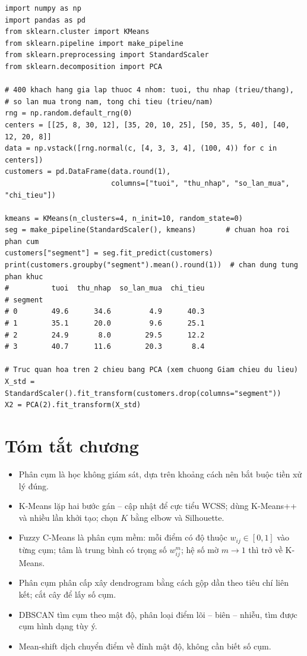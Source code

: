 \begin{lstlisting}[caption={Phân khúc khách hàng: tiền xử lý rồi phân cụm}]
import numpy as np
import pandas as pd
from sklearn.cluster import KMeans
from sklearn.pipeline import make_pipeline
from sklearn.preprocessing import StandardScaler
from sklearn.decomposition import PCA

# 400 khach hang gia lap thuoc 4 nhom: tuoi, thu nhap (trieu/thang),
# so lan mua trong nam, tong chi tieu (trieu/nam)
rng = np.random.default_rng(0)
centers = [[25, 8, 30, 12], [35, 20, 10, 25], [50, 35, 5, 40], [40, 12, 20, 8]]
data = np.vstack([rng.normal(c, [4, 3, 3, 4], (100, 4)) for c in centers])
customers = pd.DataFrame(data.round(1),
                         columns=["tuoi", "thu_nhap", "so_lan_mua", "chi_tieu"])

kmeans = KMeans(n_clusters=4, n_init=10, random_state=0)
seg = make_pipeline(StandardScaler(), kmeans)       # chuan hoa roi phan cum
customers["segment"] = seg.fit_predict(customers)
print(customers.groupby("segment").mean().round(1))  # chan dung tung phan khuc
#          tuoi  thu_nhap  so_lan_mua  chi_tieu
# segment
# 0        49.6      34.6         4.9      40.3
# 1        35.1      20.0         9.6      25.1
# 2        24.9       8.0        29.5      12.2
# 3        40.7      11.6        20.3       8.4

# Truc quan hoa tren 2 chieu bang PCA (xem chuong Giam chieu du lieu)
X_std = StandardScaler().fit_transform(customers.drop(columns="segment"))
X2 = PCA(2).fit_transform(X_std)
\end{lstlisting}

\section{Tóm tắt chương}
\begin{itemize}
    \item Phân cụm là học không giám sát, dựa trên khoảng cách nên bắt buộc tiền xử lý đúng.
    \item K-Means lặp hai bước gán -- cập nhật để cực tiểu WCSS; dùng K-Means++ và nhiều lần khởi tạo; chọn $K$ bằng elbow và Silhouette.
    \item Fuzzy C-Means là phân cụm mềm: mỗi điểm có độ thuộc $w_{ij} \in [0, 1]$ vào từng cụm; tâm là trung bình có trọng số $w_{ij}^m$; hệ số mờ $m \to 1$ thì trở về K-Means.
    \item Phân cụm phân cấp xây dendrogram bằng cách gộp dần theo tiêu chí liên kết; cắt cây để lấy số cụm.
    \item DBSCAN tìm cụm theo mật độ, phân loại điểm lõi -- biên -- nhiễu, tìm được cụm hình dạng tùy ý.
    \item Mean-shift dịch chuyển điểm về đỉnh mật độ, không cần biết số cụm.
\end{itemize}


